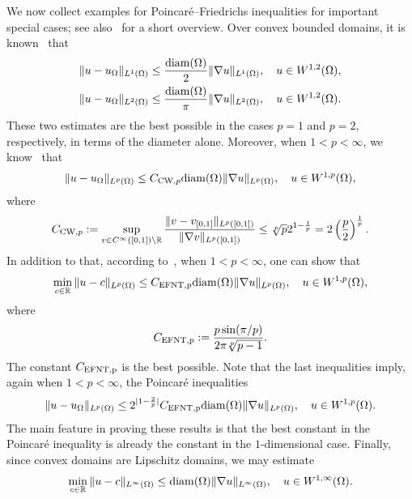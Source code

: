 \documentclass[a4paper]{amsart}
\begin{document}
We now collect examples for Poincar\'e--Friedrichs inequalities for important special cases; see also~\cite[Lemma~3.24]{ern2021finite} for a short overview. Over convex bounded domains, it is known~\cite{bebendorf2003note,acosta2004optimal} that 
\begin{align}\label{math:acostaduran}
    \| u - u_{\Omega} \|_{L^{1}(\Omega)}
    \leq 
    \frac{{\operatorname{diam}}(\Omega)}{2}
    \| \nabla u \|_{L^{1}(\Omega)}
    ,
    \quad 
    u \in W^{1,2}(\Omega)
    ,
    \\
    \| u - u_{\Omega} \|_{L^{2}(\Omega)} \label{math:bebendorf}
    \leq 
    \frac{{\operatorname{diam}}(\Omega)}{\pi}
    \| \nabla u \|_{L^{2}(\Omega)}
    ,
    \quad 
    u \in W^{1,2}(\Omega)
    .
\end{align}
These two estimates are the best possible in the cases $p=1$ and $p=2$, respectively, in terms of the diameter alone. 
Moreover, when $1 < p < \infty$, we know~\cite{chua2006estimates} that
\begin{align}\label{math:chuawheeden}
    \| u - u_{\Omega} \|_{L^{p}(\Omega)}
    \leq 
    C_{{\rm CW},p}
    {\operatorname{diam}}(\Omega)
    \| \nabla u \|_{L^{p}(\Omega)}
    ,
    \quad 
    u \in W^{1,p}(\Omega)
    ,
\end{align}
where 
\begin{align}
    C_{{\rm CW},p} 
    := 
    \sup\limits_{ v \in C^\infty([0,1]) \setminus {\mathbb R} } 
    \frac{ 
        \| v - v_{[0,1]} \|_{L^{p}([0,1])} 
    }{ 
        \| \nabla v \|_{L^{p}([0,1])} 
    }
    \leq 
    \sqrt[p]{p} 2^{1-\frac 1 p}
    =
    2
    \left( \frac p 2 \right)^{\frac 1 p}
    .
\end{align}
In addition to that,
according to~\cite{ferone2012remark,esposito2013poincare}, when $1 < p < \infty$, one can show that 
\begin{align}\label{math:esposito:pf}
    \min\limits_{ c \in {\mathbb R} }
    \| u - c \|_{L^{p}(\Omega)}
    \leq 
    C_{\rm{EFNT},p}
    {\operatorname{diam}}(\Omega)
    \| \nabla u \|_{L^{p}(\Omega)}
    ,
    \quad 
    u \in W^{1,p}(\Omega)
    ,
\end{align}
where 
\begin{align}
    C_{\rm{EFNT},p}
    :=
    \frac{ p \sin(\pi/p) }{ 2\pi \sqrt[p]{p-1} }
    .
\end{align}
The constant $C_{\rm{EFNT},p}$ is the best possible. 
Note that the last inequalities imply, again when $1 < p < \infty$, the Poincar\'e inequalities
\begin{align}\label{math:esposito:poincare}
    \| u - u_{\Omega} \|_{L^{p}(\Omega)}
    \leq 
    2^{|1-\frac 2 p|}C_{\rm{EFNT},p}
    {\operatorname{diam}}(\Omega)
    \| \nabla u \|_{L^{p}(\Omega)}
    ,
    \quad 
    u \in W^{1,p}(\Omega)
    .
\end{align}
The main feature in proving these results is that the best constant in the Poincar\'e inequality is already the constant in the $1$-dimensional case. 
Finally,
since convex domains are Lipschitz domains, we may estimate 
\begin{align}\label{math:lipschitzestimate}
    \min\limits_{ c \in {\mathbb R} }
    \| u - c \|_{L^{\infty}(\Omega)}
    \leq 
    {\operatorname{diam}}(\Omega)
    \| \nabla u \|_{L^{\infty}(\Omega)}
    ,
    \quad 
    u \in W^{1,\infty}(\Omega)
    .
\end{align}
\end{document}
